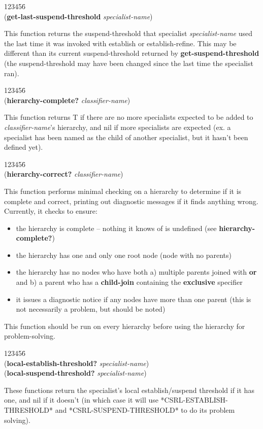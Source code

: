 \begin{tabbing}
123456\= \kill
\\
({\bf get-last-suspend-threshold} {\it specialist-name\/}) 
\end{tabbing}
This function returns the suspend-threshold that specialist {\it
specialist-name} used the last time it was invoked with establish or
establish-refine. This may be different than its current
suspend-threshold returned by {\bf get-suspend-threshold} (the
suspend-threshold may have been changed since the last time the
specialist ran).


\begin{tabbing}
123456\= \kill
\\
({\bf hierarchy-complete?} {\it classifier-name\/}) 
\end{tabbing}
This function returns T if there are no more specialists expected to
be added to {\it classifier-name\/}'s hierarchy, and nil if more
specialists are expected (ex. a specialist has been named as the child
of another specialist, but it hasn't been defined yet).

\begin{tabbing}
123456\= \kill
\\
({\bf hierarchy-correct?} {\it classifier-name\/}) 
\end{tabbing}
This function performs minimal checking on a hierarchy to determine if
it is complete and correct, printing out diagnostic messages if it
finds anything wrong. Currently, it checks to ensure:
\begin{itemize}
\item the hierarchy is complete -- nothing it knows of is undefined
(see {\bf hierarchy-complete?})
\item the hierarchy has one and only one root node (node with no parents)
\item the hierarchy has no nodes who have both a) multiple parents
joined with {\bf or} and b) a parent who has a {\bf child-join}
containing the {\bf exclusive} specifier
\item it issues a diagnostic notice if any nodes have more than one
parent (this is not necessarily a problem, but should be noted)
\end{itemize}
This function should be run on every hierarchy before using the
hierarchy for problem-solving.

\begin{tabbing}
123456\= \kill
\\
({\bf local-establish-threshold?} {\it specialist-name\/})  \\
({\bf local-suspend-threshold?} {\it specialist-name\/}) \\
\end{tabbing}
These functions return the specialist's local establish/suspend
threshold if it has one, and nil if it doesn't (in which case it will
use *CSRL-ESTABLISH-THRESHOLD* and *CSRL-SUSPEND-THRESHOLD* to do its
problem solving).


